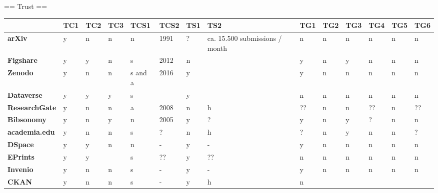 == Trust ==

\begin{tabular}{|m{2.1cm}|m{0.8cm}|m{0.8cm}|m{0.8cm}|m{0.8cm}|m{0.8cm}|m{0.8cm}|m{0.8cm}|m{0.8cm}|m{0.8cm}|m{0.8cm}|m{0.8cm}|m{0.8cm}|m{0.8cm}|} \hline 
 & \textbf{TC1}  & \textbf{TC2}  & \textbf{TC3}  & \textbf{TCS1}  & \textbf{TCS2}  & \textbf{TS1}  & \textbf{TS2}  & \textbf{TG1}  & \textbf{TG2}  & \textbf{TG3}  & \textbf{TG4}  & \textbf{TG5}  & \textbf{TG6}  \\ \hline 
\textbf{arXiv}  &y &n &n &n &1991 &? &ca. 15.500 submissions / month &n &n &n &n &n &n \\ \hline 
\textbf{Figshare}  &y &y &n &s &2012 &n & &y &n &y &n &n &n \\ \hline 
\textbf{Zenodo}  &y &n &n &s and a &2016 &y & &y &n &n &n &n &n \\ \hline 
\textbf{Dataverse}  &y &y &y &s &- &y &- &n &n &n &n &n &n \\ \hline 
\textbf{ResearchGate}  &y &n &n &a &2008 &n &h &?? &n &n &?? &n &?? \\ \hline 
\textbf{Bibsonomy}  &y &n &y &n &2005 &y &? &y &n &y &? &n &n \\ \hline 
\textbf{academia.edu}  &y &n &n &s &? &n &h &? &n &y &n &n &? \\ \hline 
 \hline 
\textbf{DSpace}  &y &y &n &n &- &y &- &y &n &n &n &n &n \\ \hline 
\textbf{EPrints}  &y &y & &s &?? &y &?? &n &n &n &n &n &n \\ \hline 
\textbf{Invenio}  &y &n &n &s &- &y &- &y &n &n &n &n &n \\ \hline 
\textbf{CKAN}  &y &n &n &s &- &y &h &n & & & & & \\ \hline 
 \end{tabular}


